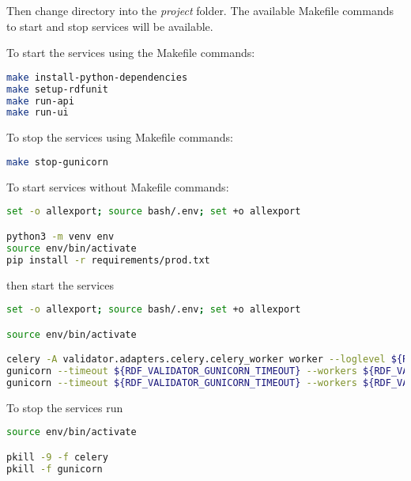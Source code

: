Then change directory into the \textit{project} folder. The available Makefile commands to start and stop services will be available.

To start the services using the Makefile commands:

\begin{lstlisting}[language=bash,]
make install-python-dependencies
make setup-rdfunit
make run-api
make run-ui
\end{lstlisting}

To stop the services using Makefile commands:

\begin{lstlisting}[language=bash,]
make stop-gunicorn
\end{lstlisting}

To start services without Makefile commands:

\begin{lstlisting}[language=bash,]
set -o allexport; source bash/.env; set +o allexport

python3 -m venv env
source env/bin/activate
pip install -r requirements/prod.txt
\end{lstlisting}

then start the services

\begin{lstlisting}[language=bash,]
set -o allexport; source bash/.env; set +o allexport

source env/bin/activate

celery -A validator.adapters.celery.celery_worker worker --loglevel ${RDF_VALIDATOR_LOG_LEVEL} --logfile ${RDF_VALIDATOR_CELERY_LOGS} --detach
gunicorn --timeout ${RDF_VALIDATOR_GUNICORN_TIMEOUT} --workers ${RDF_VALIDATOR_GUNICORN_API_WORKERS} --bind 0.0.0.0:${RDF_VALIDATOR_API_PORT} --reload validator.entrypoints.api.run:app --log-file ${RDF_VALIDATOR_API_LOGS} --log-level ${RDF_VALIDATOR_LOG_LEVEL} --daemon
gunicorn --timeout ${RDF_VALIDATOR_GUNICORN_TIMEOUT} --workers ${RDF_VALIDATOR_GUNICORN_UI_WORKERS} --bind 0.0.0.0:${RDF_VALIDATOR_UI_PORT} --reload validator.entrypoints.ui.run:app --log-file ${RDF_VALIDATOR_UI_LOGS} --log-level ${RDF_VALIDATOR_LOG_LEVEL} --daemon
\end{lstlisting}

To stop the services run

\begin{lstlisting}[language=bash,]
source env/bin/activate

pkill -9 -f celery
pkill -f gunicorn
\end{lstlisting}